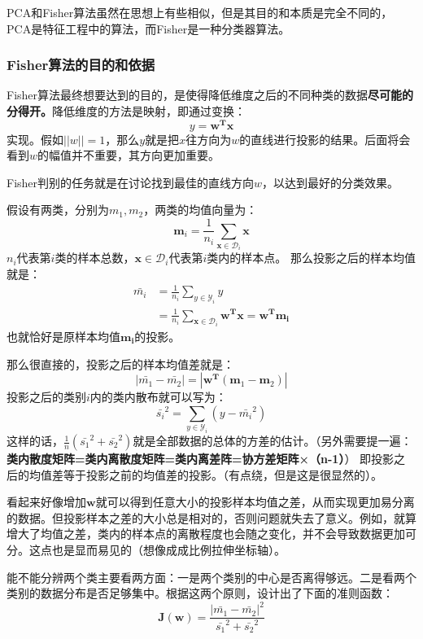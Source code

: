 \documentclass[12pt, letterpaper]{article}
\begin{document}
PCA和Fisher算法虽然在思想上有些相似，但是其目的和本质是完全不同的，PCA是特征工程中的算法，而Fisher是一种分类器算法。

\subsubsection*{Fisher算法的目的和依据}
Fisher算法最终想要达到的目的，是使得降低维度之后的不同种类的数据\textbf{尽可能的分得开。}降低维度的方法是映射，即通过变换：
$$
y= \mathbf{w^Tx}
$$
实现。假如$||w||=1$，那么$y$就是把$x$往方向为$w$的直线进行投影的结果。后面将会看到$w$的幅值并不重要，其方向更加重要。

Fisher判别的任务就是在讨论找到最佳的直线方向$w$，以达到最好的分类效果。


假设有两类，分别为$m_1,m_2$，两类的均值向量为：
$$\mathbf{m}_i=\frac{1}{n_i}\sum_{\mathbf{x}\in \mathscr{D}_i}\mathbf{x}$$
$n_i$代表第$i$类的样本总数，$\mathbf{x}\in \mathscr{D}_i$代表第$i$类内的样本点。
那么投影之后的样本均值就是：
$$
\begin{aligned}
\bar{m_i}&=\frac{1}{n_i}\sum_{y\in \mathscr{Y}_i}y\\
&=\frac{1}{n_i}\sum_{\mathbf{x}\in \mathscr{D}_i}\mathbf{w^Tx}=\mathbf{w^Tm_i}
\end{aligned}
$$
也就恰好是原样本均值$\mathbf{m_i}$的投影。

那么很直接的，投影之后的样本均值差就是：
$$
|\bar{m_1}-\bar{m_2}|=|\mathbf{w^T}(\mathbf{m}_1-\mathbf{m}_2)|
$$
投影之后的类别$i$内的类内散布就可以写为：
$$
\bar{s_i}^2=\sum_{y\in \mathscr{Y}_i}(y-\bar{m_i}^2)
$$
这样的话，$\frac{1}{n}(\bar{s_1}^2+\bar{s_2}^2)$就是全部数据的总体的方差的估计。（另外需要提一遍：\textbf{
类内散度矩阵=类内离散度矩阵=类内离差阵=协方差矩阵×（n-1）}）
即投影之后的均值差等于投影之前的均值差的投影。（有点绕，但是这是很显然的）。

看起来好像增加$\mathbf{w}$就可以得到任意大小的投影样本均值之差，从而实现更加易分离的数据。但投影样本之差的大小总是相对的，否则问题就失去了意义。例如，就算增大了均值之差，类内的样本点的离散程度也会随之变化，并不会导致数据更加可分。这点也是显而易见的（想像成成比例拉伸坐标轴）。

能不能分辨两个类主要看两方面：一是两个类别的中心是否离得够远。二是看两个类别的数据分布是否足够集中。根据这两个原则，设计出了下面的准则函数：
\begin{equation}
\mathbf{J(w)}=\frac{|\bar{m_1}-\bar{m_2}|^2}{\bar{s_1}^2+\bar{s_2}^2}
\label{a}
\end{equation}
\end{document}
